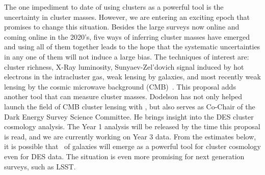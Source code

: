 The one impediment to date of using clusters as a powerful tool is the
uncertainty in cluster masses. However, we are entering an exciting
epoch that promises to change this situation. Besides the large
surveys now online and coming online in the 2020's, five ways of
inferring cluster masses have emerged and using all of them together
leads to the hope that the systematic uncertainties in any one of them
will not induce a large bias. The techniques of interest are: cluster
richness, X-Ray luminosity, Sunyaev-Zel'dovich signal induced by hot
electrons in the intracluster gas, weak lensing by galaxies, and most
recently weak lensing by the cosmic microwave background
(CMB)~\cite{Liu:2014pqa,Baxter:2014frs,2014MNRAS.439.1628Z,melchior2017,simet2017,Baxter:2017ixz}. This
proposal adds another tool that can measure cluster
masses. Dodelson has not only helped launch the field of CMB cluster
lensing with \cite{Baxter:2014frs}, but also serves as Co-Chair of the
Dark Energy Survey Science Committee. He brings insight into the DES
cluster cosmology analysis. The Year 1 analysis will be released by
the time this proposal is read, and we are currently working on Year 3
data. From the estimates below, it is possible that \atf\ of galaxies
will emerge as a powerful tool for cluster cosmology even for DES
data. The situation is even more promising for next generation
surveys, such as LSST.



